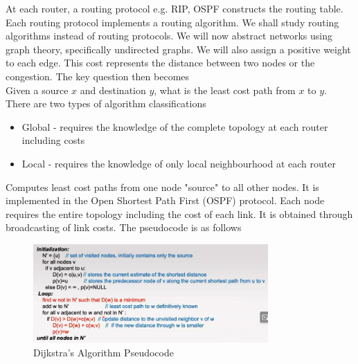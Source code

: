\documentclass[a4paper]{article}
\theoremstyle{plain}
\newtheorem{thm}{Theorem}[section]
\theoremstyle{definition}
\newtheorem{defn}{Definition}[section]
\theoremstyle{remark}
\begin{document}
\begin{tcolorbox}[colback=black!3!white,colframe=black!60!white,title=\begin{defn}Routing \label{Routing}\end{defn}]
At each router, a routing protocol e.g. RIP, OSPF constructs the routing table. Each routing protocol implements a routing algorithm. We shall study routing algorithms instead of routing protocols. We will now abstract networks using graph theory, specifically undirected graphs. We will also assign a positive weight to each edge. This cost represents the distance between two nodes or the congestion. The key question then becomes\\
Given a source $x$ and destination $y$, what is the least cost path from $x$ to $y$.\\
There are two types of algorithm classifications
\begin{itemize}
	\item Global - requires the knowledge of the complete topology at each router including costs
	\item Local - requires the knowledge of only local neighbourhood at each router
\end{itemize}
\end{tcolorbox}
\begin{tcolorbox}[colback=black!3!white,colframe=black!60!white,title=\begin{thm}Dijkstra's Algorithm \label{Dijkstra's Algorithm}\end{thm}]
	Computes least cost paths from one node "source" to all other nodes. It is implemented in the Open Shortest Path First (OSPF) protocol. Each node requires the entire topology including the cost of each link. It is obtained through broadcasting of link costs. The pseudocode is as follows
	\begin{figure}[H]
		\centering
		\includegraphics[width=0.8\textwidth]{eighty.png}
		\caption{Dijkstra's Algorithm Pseudocode}
		\label{fig:eighty-png}
	\end{figure}
\end{tcolorbox}
\end{document}
